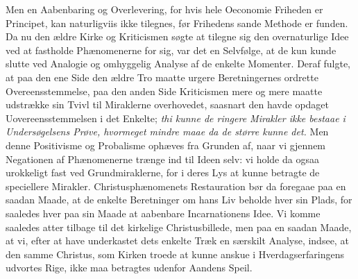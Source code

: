 \documentclass[12pt]{book}
\newcommand{\opage}[1]{\marginnote{\footnotesize\textit{[#1]}}}
\begin{document}
Men en Aabenbaring og Overlevering, for hvis hele Oeconomie Friheden er
Principet, kan naturligviis ikke tilegnes, før Frihedens sande Methode er
funden. Da nu den ældre Kirke og Kriticismen søgte at tilegne sig den
overnaturlige Idee ved at fastholde Phænomenerne for sig, var det en Selvfølge,
at de kun kunde slutte ved Analogie og omhyggelig Analyse af de enkelte
Momenter. Deraf fulgte, at paa den ene Side den ældre Tro maatte urgere
Beretningernes ordrette Overeensstemmelse, paa den anden Side Kriticismen mere
og mere maatte udstrække sin Tvivl til Miraklerne overhovedet, saasnart den
havde opdaget Uovereensstemmelsen i det Enkelte; \emph{thi kunne de ringere
Mirakler ikke bestaae i Undersøgelsens Prøve, hvormeget mindre maae da de større
kunne det.} Men denne Positivisme og Probalisme ophæves fra Grunden af, naar vi
gjennem Negationen af Phænomenerne trænge ind til Ideen selv: vi holde da ogsaa
urokkeligt fast ved Grundmiraklerne, for i deres Lys at kunne betragte de
speciellere Mirakler. Christusphænomenets Restauration bør da foregaae paa en
saadan Maade, at de enkelte Beretninger om hans Liv beholde hver sin Plads, for
saaledes hver paa sin Maade at aabenbare Incarnationens Idee.
\opage{161} %
Vi komme saaledes atter tilbage til det kirkelige Christusbillede, men paa en
saadan Maade, at vi, efter at have underkastet dets enkelte Træk en særskilt
Analyse, indsee, at den samme Christus, som Kirken troede at kunne anskue i
Hverdagserfaringens udvortes Rige, ikke maa betragtes udenfor Aandens Speil.
\end{document}
